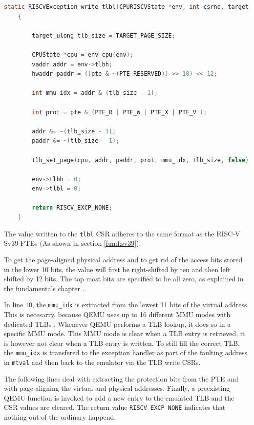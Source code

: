 \begin{lstlisting}[language=c,float=h!,
    label={lst:tlbl}]
    static RISCVException write_tlbl(CPURISCVState *env, int csrno, target_ulong pte)
    {

        target_ulong tlb_size = TARGET_PAGE_SIZE;

        CPUState *cpu = env_cpu(env);
        vaddr addr = env->tlbh;
        hwaddr paddr = ((pte & ~(PTE_RESERVED)) >> 10) << 12;

        int mmu_idx = addr & (tlb_size - 1);

        int prot = pte & (PTE_R | PTE_W | PTE_X | PTE_V );

        addr &= ~(tlb_size - 1);
        paddr &= ~(tlb_size - 1);

        tlb_set_page(cpu, addr, paddr, prot, mmu_idx, tlb_size, false);

        env->tlbh = 0;
        env->tlbl = 0;

        return RISCV_EXCP_NONE;
    }
\end{lstlisting}
The value written to the \texttt{tlbl} CSR adheres to the same format as the RISC-V Sv39 PTEs (As shown in section \ref{fund:sv39}).

To get the page-aligned physical address and to get rid of the access bits stored in the lower 10 bits,
the value will first be right-shifted by ten and then left shifted by 12 bits.
The top most bits are specified to be all zero, as explained in the fundamentals chapter \cite{RISCVInstructionSet}.

In line 10, the \texttt{mmu\_idx} is extracted from the lowest 11 bits of the virtual address. This is
necesarry, because QEMU uses up to 16 different MMU modes with dedicated TLBs \cite{QEMUSource2024}.
Whenever QEMU performs a TLB lookup, it does so in a specific MMU mode. This MMU mode is clear when
a TLB entry is retrieved, it is however not clear when a TLB entry is written.
To still fill the correct TLB, the \texttt{mmu\_idx} is transfered to the exception handler as part
of the faulting address in \texttt{mtval} and then back to the emulator via the TLB write CSRs.

The following lines deal with extracting the protection bits from the PTE and with page-aligning
the virtual and physical addresses. Finally, a preexisting QEMU function is invoked to add
a new entry to the emulated TLB and the CSR values are cleared.
The return value \texttt{RISCV\_EXCP\_NONE} indicates that nothing out of the ordinary happend.

